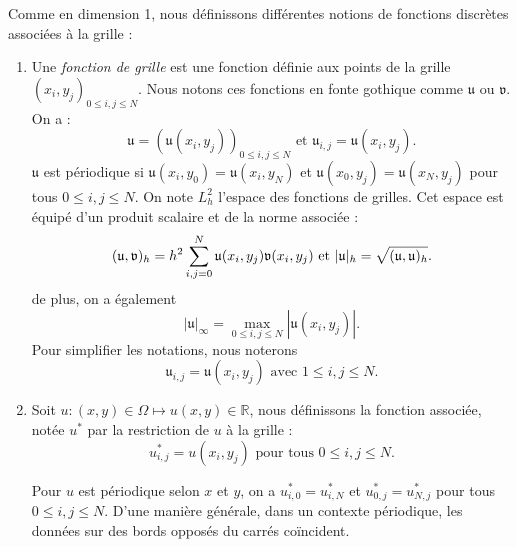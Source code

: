 Comme en dimension 1, nous définissons différentes notions de fonctions discrètes associées à la grille :
\begin{enumerate}
\item Une \textit{fonction de grille} est une fonction définie aux points de la grille $(x_i,y_j)_{0 \leq i,j \leq N}$. Nous notons ces fonctions en fonte gothique comme $\mathfrak{u}$ ou $\mathfrak{v}$. On a :
\begin{equation}
\mathfrak{u} = \left( \mathfrak{u}(x_i,y_j) \right)_{0 \leq i,j \leq N} \text{ et } \mathfrak{u}_{i,j} = \mathfrak{u}(x_i,y_j).
\end{equation}
$\mathfrak{u}$ est périodique si $\mathfrak{u}(x_{i},y_0) = \mathfrak{u}(x_{i},y_N)$ et $\mathfrak{u}(x_{0},y_j) = \mathfrak{u}(x_{N},y_j)$ pour tous $0 \leq i,j \leq N$.
On note $L^2_h$ l'espace des fonctions de grilles. Cet espace est équipé d'un produit scalaire et de la norme associée :
\begin{equation}
(\mathfrak{u}, \mathfrak{v})_h = h^2 \displaystyle\sum\limits_{i,j=0}^N \mathfrak{u}(x_i,y_j) \mathfrak{v}(x_i,y_j) \text{ et } |\mathfrak{u}|_h = \sqrt{(\mathfrak{u},\mathfrak{u})_h}.
\end{equation}
de plus, on a également
\begin{equation}
| \mathfrak{u} |_{\infty} = \max_{0 \leq i,j \leq N} |\mathfrak{u}(x_i,y_j)|.
\end{equation}
Pour simplifier les notations, nous noterons
\begin{equation}
\mathfrak{u}_{i,j} = \mathfrak{u}(x_i, y_j) \text{ avec } 1 \leq i,j \leq N.
\end{equation}

\item Soit $u : (x,y) \in \Omega \mapsto u(x,y) \in \mathbb{R}$, nous définissons la fonction associée, notée $u^*$ par la restriction de $u$ à la grille :
\begin{equation}
u^*_{i,j} = u(x_i, y_j) \text{ pour tous } 0 \leq i,j \leq N.
\end{equation}

Pour $u$ est périodique selon $x$ et $y$, on a $u^*_{i,0}=u^*_{i,N}$ et $u^*_{0,j}=u^*_{N,j}$ pour tous $0 \leq i,j \leq N$.
D'une manière générale, dans un contexte périodique, les données sur des bords opposés du carrés coïncident.


\end{enumerate}
